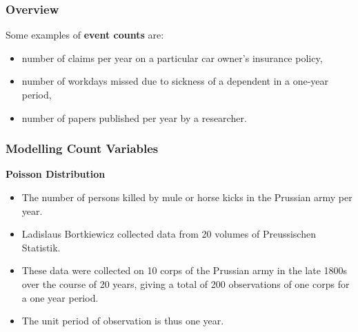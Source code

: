 \documentclass[MASTER.tex]{subfiles}
\begin{document}
%		
%		
\begin{frame}
	\frametitle{Overview}
\vspace{-0.5cm}
	\Large Some
examples of \textbf{ event counts } are:
\begin{itemize}
\item number of claims per year on a particular car owner’s insurance policy,
\item number of workdays missed due to sickness of a dependent in a one-year period,
\item number of papers published per year by a researcher.
\end{itemize}
\end{frame}
\begin{frame}[fragile]
\frametitle{Modelling Count Variables } 
\Large	
\textbf{Poisson Distribution} 
	
\begin{itemize}
		\item The number of persons killed by mule or horse kicks in the Prussian army per year. 
		\item Ladislaus Bortkiewicz collected data from 20 volumes of Preussischen Statistik. 
		\item These data were collected on 10 corps of the Prussian army in the late 1800s over the course of 20 years, giving a total of 200 observations of one corps for a one year period. \item The unit period of observation is thus one year. 
\end{itemize}
	
\end{frame}
\end{document}
